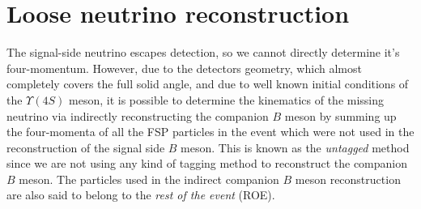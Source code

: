 \documentclass[headings=standardclasses,headings=big,oneside,a4paper,openany,12pt]{scrbook}
\begin{document}
\section{Loose neutrino reconstruction}\label{sec:loose-neutrino-reconstruction}

%


The signal-side neutrino escapes detection, so we cannot directly determine it's four-momentum. However, due to the detectors geometry, which almost completely covers the full solid angle, and due to well known initial conditions of the $\Upsilon(4S)$ meson, it is possible to determine the kinematics of the missing neutrino via indirectly reconstructing the companion $B$ meson by summing up the four-momenta of all the FSP particles in the event which were not used in the reconstruction of the signal side $B$ meson. This is known as the \textit{untagged} method since we are not using any kind of tagging method to reconstruct the companion $B$ meson. The particles used in the indirect companion $B$ meson reconstruction are also said to belong to the \textit{rest of the event} (ROE).
\end{document}
